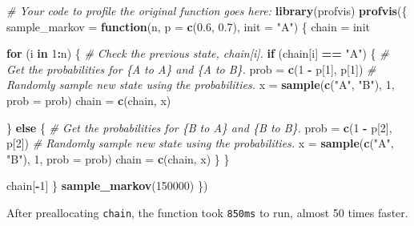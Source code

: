 \documentclass[
]{article}
\newenvironment{Shaded}{\begin{snugshade}}{\end{snugshade}}
\newcommand{\CommentTok}[1]{\textcolor[rgb]{0.56,0.35,0.01}{\textit{#1}}}
\newcommand{\ControlFlowTok}[1]{\textcolor[rgb]{0.13,0.29,0.53}{\textbf{#1}}}
\newcommand{\DataTypeTok}[1]{\textcolor[rgb]{0.13,0.29,0.53}{#1}}
\newcommand{\DecValTok}[1]{\textcolor[rgb]{0.00,0.00,0.81}{#1}}
\newcommand{\FloatTok}[1]{\textcolor[rgb]{0.00,0.00,0.81}{#1}}
\newcommand{\KeywordTok}[1]{\textcolor[rgb]{0.13,0.29,0.53}{\textbf{#1}}}
\newcommand{\NormalTok}[1]{#1}
\newcommand{\OperatorTok}[1]{\textcolor[rgb]{0.81,0.36,0.00}{\textbf{#1}}}
\newcommand{\StringTok}[1]{\textcolor[rgb]{0.31,0.60,0.02}{#1}}
\begin{document}
\begin{Shaded}
\begin{Highlighting}[]
\CommentTok{\# Your code to profile the original function goes here:}
\KeywordTok{library}\NormalTok{(profvis)}
\KeywordTok{profvis}\NormalTok{(\{}
\NormalTok{  sample\_markov =}\StringTok{ }\ControlFlowTok{function}\NormalTok{(n, }\DataTypeTok{p =} \KeywordTok{c}\NormalTok{(}\FloatTok{0.6}\NormalTok{, }\FloatTok{0.7}\NormalTok{), }\DataTypeTok{init =} \StringTok{"A"}\NormalTok{) \{}
\NormalTok{  chain =}\StringTok{ }\NormalTok{init}

  \ControlFlowTok{for}\NormalTok{ (i }\ControlFlowTok{in} \DecValTok{1}\OperatorTok{:}\NormalTok{n) \{}
    \CommentTok{\# Check the previous state, chain[i].}
    \ControlFlowTok{if}\NormalTok{ (chain[i] }\OperatorTok{==}\StringTok{ "A"}\NormalTok{) \{}
      \CommentTok{\# Get the probabilities for \{A to A\} and \{A to B\}.}
\NormalTok{      prob =}\StringTok{ }\KeywordTok{c}\NormalTok{(}\DecValTok{1} \OperatorTok{{-}}\StringTok{ }\NormalTok{p[}\DecValTok{1}\NormalTok{], p[}\DecValTok{1}\NormalTok{])}
      \CommentTok{\# Randomly sample new state using the probabilities.}
\NormalTok{      x =}\StringTok{ }\KeywordTok{sample}\NormalTok{(}\KeywordTok{c}\NormalTok{(}\StringTok{"A"}\NormalTok{, }\StringTok{"B"}\NormalTok{), }\DecValTok{1}\NormalTok{, }\DataTypeTok{prob =}\NormalTok{ prob)}
\NormalTok{      chain =}\StringTok{ }\KeywordTok{c}\NormalTok{(chain, x)}

\NormalTok{    \} }\ControlFlowTok{else}\NormalTok{ \{}
      \CommentTok{\# Get the probabilities for \{B to A\} and \{B to B\}.}
\NormalTok{      prob =}\StringTok{ }\KeywordTok{c}\NormalTok{(}\DecValTok{1} \OperatorTok{{-}}\StringTok{ }\NormalTok{p[}\DecValTok{2}\NormalTok{], p[}\DecValTok{2}\NormalTok{])}
      \CommentTok{\# Randomly sample new state using the probabilities.}
\NormalTok{      x =}\StringTok{ }\KeywordTok{sample}\NormalTok{(}\KeywordTok{c}\NormalTok{(}\StringTok{"A"}\NormalTok{, }\StringTok{"B"}\NormalTok{), }\DecValTok{1}\NormalTok{, }\DataTypeTok{prob =}\NormalTok{ prob)}
\NormalTok{      chain =}\StringTok{ }\KeywordTok{c}\NormalTok{(chain, x)}
\NormalTok{    \}}
\NormalTok{  \}}

\NormalTok{  chain[}\OperatorTok{{-}}\DecValTok{1}\NormalTok{]}
\NormalTok{\}}
  \KeywordTok{sample\_markov}\NormalTok{(}\DecValTok{150000}\NormalTok{)}
\NormalTok{\})}
\end{Highlighting}
\end{Shaded}

After preallocating \texttt{chain}, the function took \texttt{850ms} to
run, almost 50 times faster.
\end{document}
